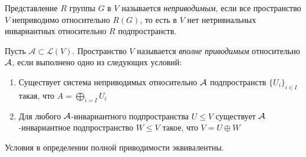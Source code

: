 \begin{definition}
	Представление $R$ группы $G$ в $V$ называется \textit{неприводимым}, если все пространство $V$ неприводимо относительно $R(G)$, то есть в $V$ нет нетривиальных инвариантных относительно $R$ подпространств.
\end{definition}

\begin{definition}
	Пусть $\mathcal A \subset \mathcal{L}(V)$. Пространство $V$ называется \textit{вполне приводимым} относительно $\mathcal A$, если выполнено одно из следующих условий:
	\begin{enumerate}
		\item Существует система неприводимых относительно $\mathcal A$ подпространств $\{U_i\}_{i \in I}$ такая, что $A = \bigoplus_{i = I}U_i$
		\item Для любого $\mathcal A$-инвариантного подпространства $U \le V$ существует $\mathcal A$-инвариантное подпространство $W \le V$ такое, что $V = U \oplus W$
	\end{enumerate}
\end{definition}

\begin{theorem}
	Условия в определении полной приводимости эквивалентны.
\end{theorem}

